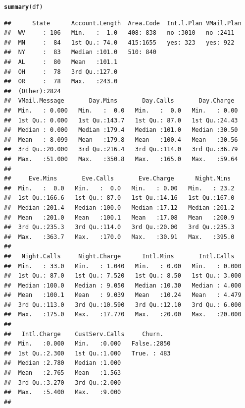 \documentclass{article}\usepackage[]{graphicx}\usepackage[]{color}
\makeatletter
\newcommand{\hlstd}[1]{\textcolor[rgb]{0.345,0.345,0.345}{#1}}%
\newcommand{\hlkwd}[1]{\textcolor[rgb]{0.737,0.353,0.396}{\textbf{#1}}}%
\newenvironment{kframe}{%
 \def\at@end@of@kframe{}%
 \ifinner\ifhmode%
  \def\at@end@of@kframe{\end{minipage}}%
  \begin{minipage}{\columnwidth}%
 \fi\fi%
 \def\FrameCommand##1{\hskip\@totalleftmargin \hskip-\fboxsep
 \colorbox{shadecolor}{##1}\hskip-\fboxsep
     \hskip-\linewidth \hskip-\@totalleftmargin \hskip\columnwidth}%
 \MakeFramed {\advance\hsize-\width
   \@totalleftmargin\z@ \linewidth\hsize
   \@setminipage}}%
 {\par\unskip\endMakeFramed%
 \at@end@of@kframe}
\newenvironment{knitrout}{}{} %
\makeatother
\begin{document}
\begin{knitrout}
\color{fgcolor}\begin{kframe}
\begin{alltt}
\hlkwd{summary}\hlstd{(df)}
\end{alltt}
\begin{verbatim}
##      State      Account.Length  Area.Code  Int.l.Plan VMail.Plan
##  WV     : 106   Min.   :  1.0   408: 838   no :3010   no :2411  
##  MN     :  84   1st Qu.: 74.0   415:1655   yes: 323   yes: 922  
##  NY     :  83   Median :101.0   510: 840                        
##  AL     :  80   Mean   :101.1                                   
##  OH     :  78   3rd Qu.:127.0                                   
##  OR     :  78   Max.   :243.0                                   
##  (Other):2824                                                   
##  VMail.Message       Day.Mins       Day.Calls       Day.Charge   
##  Min.   : 0.000   Min.   :  0.0   Min.   :  0.0   Min.   : 0.00  
##  1st Qu.: 0.000   1st Qu.:143.7   1st Qu.: 87.0   1st Qu.:24.43  
##  Median : 0.000   Median :179.4   Median :101.0   Median :30.50  
##  Mean   : 8.099   Mean   :179.8   Mean   :100.4   Mean   :30.56  
##  3rd Qu.:20.000   3rd Qu.:216.4   3rd Qu.:114.0   3rd Qu.:36.79  
##  Max.   :51.000   Max.   :350.8   Max.   :165.0   Max.   :59.64  
##                                                                  
##     Eve.Mins       Eve.Calls       Eve.Charge      Night.Mins   
##  Min.   :  0.0   Min.   :  0.0   Min.   : 0.00   Min.   : 23.2  
##  1st Qu.:166.6   1st Qu.: 87.0   1st Qu.:14.16   1st Qu.:167.0  
##  Median :201.4   Median :100.0   Median :17.12   Median :201.2  
##  Mean   :201.0   Mean   :100.1   Mean   :17.08   Mean   :200.9  
##  3rd Qu.:235.3   3rd Qu.:114.0   3rd Qu.:20.00   3rd Qu.:235.3  
##  Max.   :363.7   Max.   :170.0   Max.   :30.91   Max.   :395.0  
##                                                                 
##   Night.Calls     Night.Charge      Intl.Mins       Intl.Calls    
##  Min.   : 33.0   Min.   : 1.040   Min.   : 0.00   Min.   : 0.000  
##  1st Qu.: 87.0   1st Qu.: 7.520   1st Qu.: 8.50   1st Qu.: 3.000  
##  Median :100.0   Median : 9.050   Median :10.30   Median : 4.000  
##  Mean   :100.1   Mean   : 9.039   Mean   :10.24   Mean   : 4.479  
##  3rd Qu.:113.0   3rd Qu.:10.590   3rd Qu.:12.10   3rd Qu.: 6.000  
##  Max.   :175.0   Max.   :17.770   Max.   :20.00   Max.   :20.000  
##                                                                   
##   Intl.Charge    CustServ.Calls     Churn.    
##  Min.   :0.000   Min.   :0.000   False.:2850  
##  1st Qu.:2.300   1st Qu.:1.000   True. : 483  
##  Median :2.780   Median :1.000                
##  Mean   :2.765   Mean   :1.563                
##  3rd Qu.:3.270   3rd Qu.:2.000                
##  Max.   :5.400   Max.   :9.000                
## 
\end{verbatim}
\end{kframe}
\end{knitrout}
\end{document}
